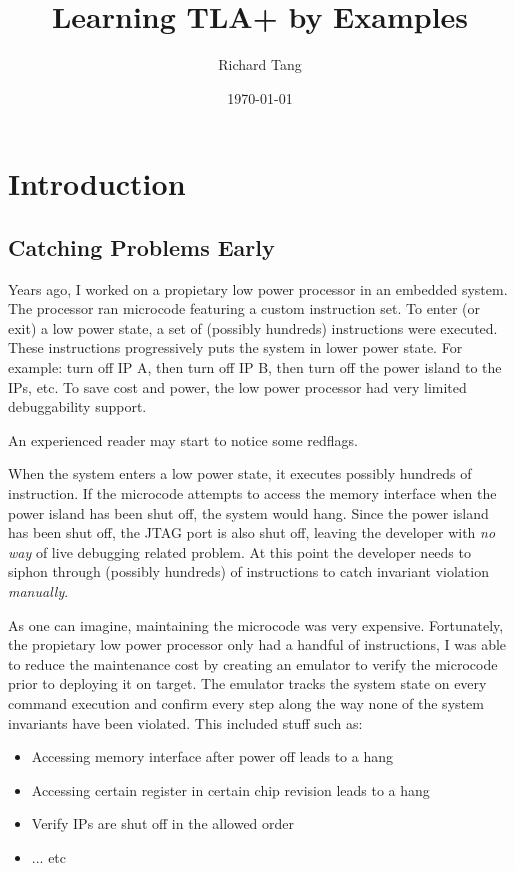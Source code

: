 \documentclass{report}
\title{Learning TLA+ by Examples}
\author{Richard Tang}
\date{\today}
\begin{document}
\maketitle
\tableofcontents

\chapter{Introduction}

\section{Catching Problems Early}

Years ago, I worked on a propietary low power processor in an embedded system.
The processor ran microcode featuring a custom instruction set. To enter (or
exit) a low power state, a set of (possibly hundreds) instructions were
executed. These instructions progressively puts the system in lower power state.
For example: turn off IP A, then turn off IP B, then turn off the power island to
the IPs, etc. To save cost and power, the low power processor had very limited
debuggability support.\newline

An experienced reader may start to notice some redflags.\newline

When the system enters a low power state, it executes possibly hundreds of
instruction.  If the microcode attempts to access the memory interface when the
power island has been shut off, the system would hang. Since the power island
has been shut off, the JTAG port is also shut off, leaving the developer with
\textit{no way} of live debugging related problem. At this point the developer
needs to siphon through (possibly hundreds) of instructions to catch invariant
violation \textit{manually}.\newline

As one can imagine, maintaining the microcode was very expensive. Fortunately,
the propietary low power processor only had a handful of instructions, I was
able to reduce the maintenance cost by creating an emulator to verify the
microcode prior to deploying it on target. The emulator tracks the system state
on every command execution and confirm every step along the way none of the
system invariants have been violated. This included stuff such as: 
\begin{itemize}
    \item Accessing memory interface after power off leads to a hang
    \item Accessing certain register in certain chip revision leads to a hang 
    \item Verify IPs are shut off in the allowed order
    \item ... etc
\end{itemize}
\end{document}
